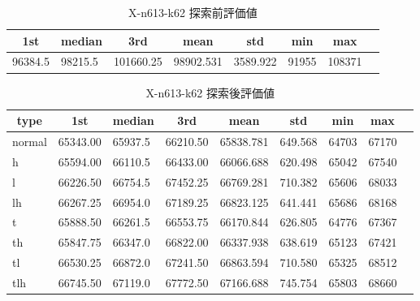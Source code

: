\begin{table}[htbp]
    \caption{X-n613-k62 探索前評価値}
    \begin{tabular}{|l|l|l|l|l|l|l|l|}\hline
    \multicolumn{1}{|c|}{\textbf{1st}}
    &\multicolumn{1}{c|}{\textbf{median}}
    &\multicolumn{1}{c|}{\textbf{3rd}}
    &\multicolumn{1}{c|}{\textbf{mean}}
    &\multicolumn{1}{c|}{\textbf{std}}
    &\multicolumn{1}{c|}{\textbf{min}}
    &\multicolumn{1}{c|}{\textbf{max}}\\\hline
	96384.5 & 98215.5 & 101660.25 & 98902.531 & 3589.922 & 91955 & 108371\\\hline
	\end{tabular}
\end{table}
\begin{table}[htbp]
    \caption{X-n613-k62 探索後評価値}
    \begin{tabular}{|l|l|l|l|l|l|l|l|l|}\hline
    \multicolumn{1}{|c|}{\textbf{type}}
    &\multicolumn{1}{|c|}{\textbf{1st}}
    &\multicolumn{1}{c|}{\textbf{median}}
    &\multicolumn{1}{c|}{\textbf{3rd}}
    &\multicolumn{1}{c|}{\textbf{mean}}
    &\multicolumn{1}{c|}{\textbf{std}}
    &\multicolumn{1}{c|}{\textbf{min}}
    &\multicolumn{1}{c|}{\textbf{max}}\\\hline
	normal & 65343.00 & 65937.5 & 66210.50 & 65838.781 & 649.568 & 64703 & 67170\\\hline
	h & 65594.00 & 66110.5 & 66433.00 & 66066.688 & 620.498 & 65042 & 67540\\\hline
	l & 66226.50 & 66754.5 & 67452.25 & 66769.281 & 710.382 & 65606 & 68033\\\hline
	lh & 66267.25 & 66954.0 & 67189.25 & 66823.125 & 641.441 & 65686 & 68168\\\hline
	t & 65888.50 & 66261.5 & 66553.75 & 66170.844 & 626.805 & 64776 & 67367\\\hline
	th & 65847.75 & 66347.0 & 66822.00 & 66337.938 & 638.619 & 65123 & 67421\\\hline
	tl & 66530.25 & 66872.0 & 67241.50 & 66863.594 & 710.580 & 65325 & 68512\\\hline
	tlh & 66745.50 & 67119.0 & 67772.50 & 67166.688 & 745.754 & 65803 & 68660\\\hline
	\end{tabular}
\end{table}
